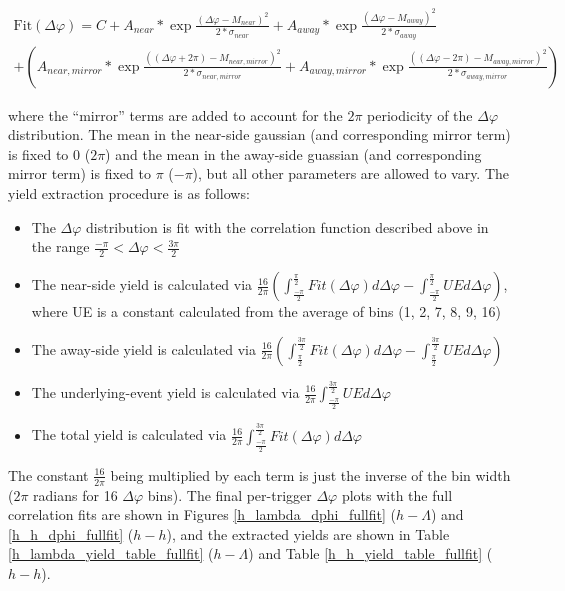 \documentclass[ALICE,manyauthors]{ALICE_analysis_notes}
\begin{document}
\begin{gather*}
	\text{Fit}(\Delta\varphi) = C + A_{near}*\exp{\frac{(\Delta\varphi - M_{near})^2}{2*\sigma_{near}}} + A_{away}*\exp{\frac{(\Delta\varphi - M_{away})^2}{2*\sigma_{away}}} \\
	+ (A_{near,mirror}*\exp{\frac{((\Delta\varphi+2\pi) - M_{near,mirror})^2}{2*\sigma_{near,mirror}}} + A_{away,mirror}*\exp{\frac{((\Delta\varphi-2\pi) - M_{away,mirror})^2}{2*\sigma_{away,mirror}}})
\end{gather*}

where the ``mirror'' terms are added to account for the $2\pi$ periodicity of the $\Delta\varphi$ distribution. The mean in the near-side gaussian (and corresponding mirror term) is fixed to 0 ($2\pi$) and the mean in the away-side guassian (and corresponding mirror term) is fixed to $\pi$ ($-\pi$), but all other parameters are allowed to vary. The yield extraction procedure is as follows:

\begin{itemize}
\item The $\Delta\varphi$ distribution is fit with the correlation function described above in the range $\frac{-\pi}{2} < \Delta\varphi < \frac{3\pi}{2}$
\item The near-side yield is calculated via $\frac{16}{2\pi}(\int_{\frac{-\pi}{2}}^{\frac{\pi}{2}}Fit(\Delta\varphi)d\Delta\varphi - \int_{\frac{-\pi}{2}}^{\frac{\pi}{2}}UE d\Delta\varphi)$, where UE is a constant calculated from the average of bins (1, 2, 7, 8, 9, 16)
\item The away-side yield is calculated via $\frac{16}{2\pi}(\int_{\frac{\pi}{2}}^{\frac{3\pi}{2}}Fit(\Delta\varphi)d\Delta\varphi - \int_{\frac{\pi}{2}}^{\frac{3\pi}{2}}UE d\Delta\varphi)$
\item The underlying-event yield is calculated via $\frac{16}{2\pi}\int_{\frac{-\pi}{2}}^{\frac{3\pi}{2}}UE d\Delta\varphi$
\item The total yield is calculated via $\frac{16}{2\pi}\int_{\frac{-\pi}{2}}^{\frac{3\pi}{2}}Fit(\Delta\varphi) d\Delta\varphi$
\end{itemize}

The constant $\frac{16}{2\pi}$ being multiplied by each term is just the inverse of the bin width ($2\pi$ radians for 16 $\Delta\varphi$ bins).
The final per-trigger $\Delta\varphi$ plots with the full correlation fits are shown in Figures \ref{h_lambda_dphi_fullfit} ($h-\Lambda$) and \ref{h_h_dphi_fullfit} ($h-h$), and the extracted yields are shown in Table \ref{h_lambda_yield_table_fullfit} ($h-\Lambda$) and Table \ref{h_h_yield_table_fullfit} ($h-h$). 
\end{document}
